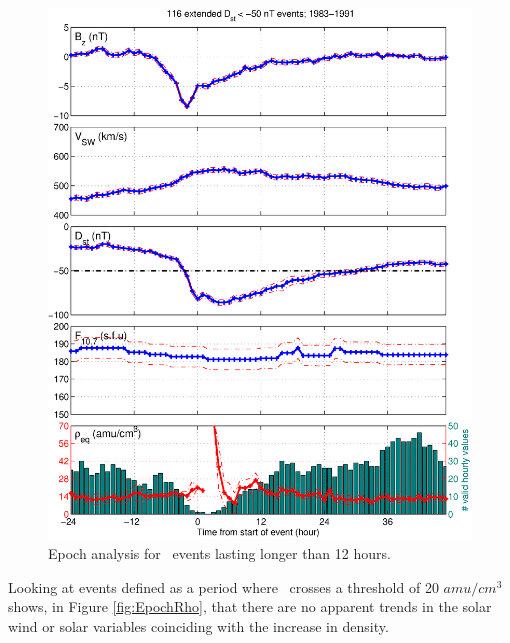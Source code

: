 \begin{figure}[htp!]
	\centering
	\includegraphics[width=1\linewidth]{Figures/StormAvs/stormavs-dd12-GOES6}
	\caption{Epoch analysis for \dst\ events lasting longer than 12 hours.}
	\label{fig:EpochDst12Hour}
\end{figure}

Looking at events defined as a period where \req\ crosses a threshold of 20 $amu/cm^3$ shows, in Figure \ref{fig:EpochRho}, that there are no apparent trends in the solar wind or solar variables coinciding with the increase in density.

